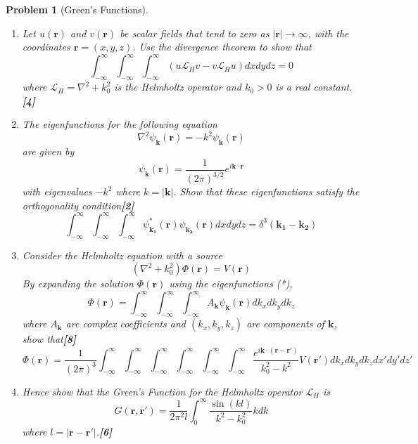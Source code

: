 \documentclass[a4paper]{article}
\theoremstyle{new}
\newtheorem{qns}{Problem}[section]
\begin{document}
\begin{qns}[Green's Functions]\leavevmode
\begin{enumerate}[label=(\roman*)]
\item Let $u(\mathbf{r})$ and $v(\mathbf{r})$ be scalar fields that tend to zero as $|\mathbf{r}|\rightarrow\infty$, with the coordinates $\mathbf{r} = (x, y, z)$. Use the divergence theorem to show that
$$\int_{-\infty}^\infty \int_{-\infty}^\infty\int_{-\infty}^\infty (u\mathcal{L}_Hv-v\mathcal{L}_Hu)dxdydz=0$$
where $\mathcal{L}_H=\nabla^2+k_0^2$ is the Helmholtz operator and $k_0>0$ is a real constant.\hfill\textbf{[4]}
\item The eigenfunctions for the following equation
$$\nabla^2\psi_\mathbf{k}(\mathbf{r})=-k^2\psi_\mathbf{k}(\mathbf{r})$$
are given by
\begin{equation}
  \psi_\mathbf{k}(\mathbf{r})=\frac{1}{(2\pi)^{3/2}}e^{i\mathbf{k}\cdot\mathbf{r}}\tag{*}  
\end{equation}
with eigenvalues $−k^2$ where $k=|\mathbf{k}|$. Show that these eigenfunctions satisfy the orthogonality condition\hfill\textbf{[2]}
$$\int_{-\infty}^\infty\int_{-\infty}^\infty\int_{-\infty}^\infty \psi^*_{\mathbf{k_1}}(\mathbf{r})\psi_{\mathbf{k_2}}(\mathbf{r})dxdydz=\delta^3(\mathbf{k_1}-\mathbf{k_2})$$
\item Consider the Helmholtz equation with a source
$$(\nabla^2+k_0^2)\Phi(\mathbf{r})=V(\mathbf{r})$$
By expanding the solution $\Phi(\mathbf{r})$ using the eigenfunctions (*),
$$\Phi(\mathbf{r})=\int_{-\infty}^\infty\int_{-\infty}^\infty\int_{-\infty}^\infty A_\mathbf{k}\psi_\mathbf{k}(\mathbf{r})dk_xdk_ydk_z$$
where $A_\mathbf{k}$ are complex coefficients and $(k_x, k_y, k_z)$ are components of $\mathbf{k}$, show that\hfill\textbf{[8]}
$$\Phi(\mathbf{r})=\frac{1}{(2\pi)^3}\int_{-\infty}^\infty\int_{-\infty}^\infty\int_{-\infty}^\infty\int_{-\infty}^\infty\int_{-\infty}^\infty\int_{-\infty}^\infty\frac{e^{i\mathbf{k}\cdot(\mathbf{r}-\mathbf{r'})}}{k_0^2-k^2}V(\mathbf{r'})dk_xdk_ydk_zdx'dy'dz'$$
\item Hence show that the Green’s Function for the Helmholtz operator $\mathcal{L}_H$ is
$$G(\mathbf{r},\mathbf{r'})=\frac{1}{2\pi^2l}\int_0^\infty\frac{\sin(kl)}{k^2-k_0^2}kdk$$
where $l=|\mathbf{r}-\mathbf{r'}|$.\hfill\textbf{[6]}
\end{enumerate}
\end{qns}
\newpage
\end{document}
